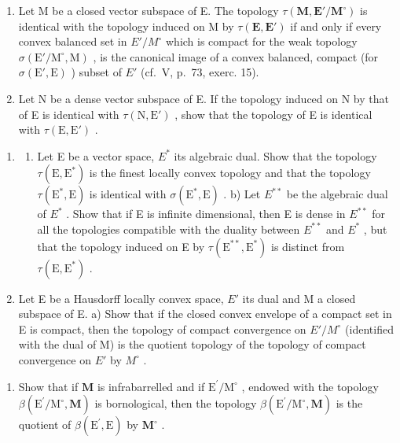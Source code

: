 \begin{enumerate}
\def\labelenumi{\alph{enumi})}
\item
  Let M be a closed vector subspace of E. The topology \(\tau(\mathbf{M}, \mathbf{E}'/\mathbf{M}^{\circ})\) is identical with the topology induced on M by \(\tau(\mathbf{E}, \mathbf{E}')\) if and only if every convex balanced set in \(E'/M^{\circ}\) which is compact for the weak topology \(\sigma(\mathrm{E}'/\mathrm{M}^{\circ}, \mathrm{M})\) , is the canonical image of a convex balanced, compact (for \(\sigma(\mathrm{E}', \mathrm{E})\) ) subset of \(E'\) (cf.~V, p.~73, exerc. 15).
\item
  Let N be a dense vector subspace of E. If the topology induced on N by that of E is identical with \(\tau(\mathrm{N}, \mathrm{E}')\) , show that the topology of E is identical with \(\tau(\mathrm{E}, \mathrm{E}')\) .
\end{enumerate}

\begin{enumerate}
\def\labelenumi{\arabic{enumi})}
\setcounter{enumi}{20}
\tightlist
\item
  \begin{enumerate}
  \def\labelenumii{\alph{enumii})}
  \tightlist
  \item
    Let E be a vector space, \(E^{*}\) its algebraic dual. Show that the topology \(\tau(\mathrm{E},\mathrm{E}^{*})\) is the finest locally convex topology and that the topology \(\tau(\mathrm{E}^{*},\mathrm{E})\) is identical with \(\sigma(\mathrm{E}^{*},\mathrm{E})\) . b) Let \(E^{**}\) be the algebraic dual of \(E^{*}\) . Show that if E is infinite dimensional, then E is dense in \(E^{**}\) for all the topologies compatible with the duality between \(E^{**}\) and \(E^{*}\) , but that the topology induced on E by \(\tau(\mathrm{E}^{**},\mathrm{E}^{*})\) is distinct from \(\tau(\mathrm{E},\mathrm{E}^{*})\) .
  \end{enumerate}
\item
  Let E be a Hausdorff locally convex space, \(E'\) its dual and M a closed subspace of E. a) Show that if the closed convex envelope of a compact set in E is compact, then the topology of compact convergence on \(E'/M^{\circ}\) (identified with the dual of M) is the quotient topology of the topology of compact convergence on \(E'\) by \(M^{\circ}\) .
\end{enumerate}

\begin{enumerate}
\def\labelenumi{\alph{enumi})}
\setcounter{enumi}{1}
\tightlist
\item
  Show that if \(\mathbf{M}\) is infrabarrelled and if \(\mathrm{E}^{\prime} / \mathrm{M}^{\circ}\) , endowed with the topology \(\beta (\mathrm{E}^{\prime} / \mathrm{M}^{\circ},\mathbf{M})\) is bornological, then the topology \(\beta (\mathrm{E}^{\prime} / \mathrm{M}^{\circ},\mathbf{M})\) is the quotient of \(\beta (\mathrm{E}^{\prime},\mathrm{E})\) by \(\mathbf{M}^{\circ}\) .
\end{enumerate}

